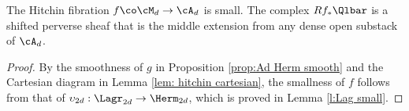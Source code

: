 




\begin{cor}
\notready\label{c:small}
The Hitchin fibration $f \co \cM_d \rightarrow \cA_d$ is small. The complex $Rf_{*}\Qlbar$ is a shifted perverse sheaf that is the middle extension from any dense open substack of $\cA_{d}$.
\end{cor}
\begin{proof}
By the smoothness of $g$ in Proposition \ref{prop:Ad Herm smooth} and the Cartesian diagram in Lemma \ref{lem: hitchin cartesian}, the smallness of $f$ follows from that of $\upsilon_{2d}: \Lagr_{2d}\to \Herm_{2d}$, which is proved in Lemma \ref{l:Lag small}.
\end{proof}



